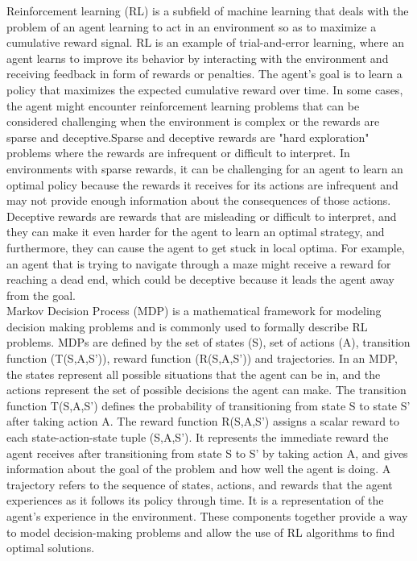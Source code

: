 \documentclass[runningheads]{llncs}%
\begin{document}
Reinforcement learning (RL) is a subfield of machine learning that deals with the problem of an agent learning to act in an environment so as to maximize a cumulative reward signal. RL is an example of trial-and-error learning, where an agent learns to improve its behavior by interacting with the environment and receiving feedback in form of rewards or penalties. The agent's goal is to learn a policy that maximizes the expected cumulative reward over time. In some cases, the agent might encounter reinforcement learning problems that can be considered challenging when the environment is complex or the rewards are sparse and deceptive.Sparse and deceptive rewards are "hard exploration" problems where the rewards are infrequent or difficult to interpret. In environments with sparse rewards, it can be challenging for an agent to learn an optimal policy because the rewards it receives for its actions are infrequent and may not provide enough information about the consequences of those actions. Deceptive rewards are rewards that are misleading or difficult to interpret, and they can make it even harder for the agent to learn an optimal strategy, and furthermore, they can cause the agent to get stuck in local optima. For example, an agent that is trying to navigate through a maze might receive a reward for reaching a dead end, which could be deceptive because it leads the agent away from the goal.\\
 
Markov Decision Process (MDP) is a mathematical framework for modeling decision making problems and is commonly used to formally describe RL problems. MDPs are defined by the set of states (S), set of actions (A), transition function (T(S,A,S')), reward function (R(S,A,S')) and trajectories. In an MDP, the states represent all possible situations that the agent can be in, and the actions represent the set of possible decisions the agent can make. The transition function T(S,A,S') defines the probability of transitioning from state S to state S' after taking action A. The reward function R(S,A,S') assigns a scalar reward to each state-action-state tuple (S,A,S'). It represents the immediate reward the agent receives after transitioning from state S to S' by taking action A, and gives information about the goal of the problem and how well the agent is doing. A trajectory refers to the sequence of states, actions, and rewards that the agent experiences as it follows its policy through time. It is a representation of the agent's experience in the environment. These components together provide a way to model decision-making problems and allow the use of RL algorithms to find optimal solutions.\\
\end{document}
